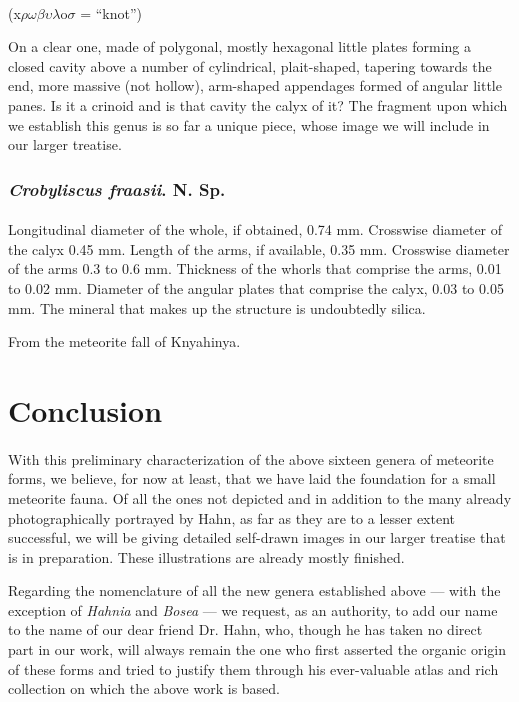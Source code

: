 \documentclass[a4paper, 12pt, oneside]{article}
\begin{document}
\paragraph{}
(x$\rho\omega\beta\upsilon\lambda$o$\sigma$ = ``knot'')%

On a clear one, made of polygonal, mostly hexagonal little plates forming a closed cavity above a number of cylindrical, plait-shaped, tapering towards the end, more massive (not hollow), arm-shaped appendages formed of angular little panes. Is it a crinoid and is that cavity the calyx of it? The fragment upon which we establish this genus is so far a unique piece, whose image we will include in our larger treatise.
\subsubsection{\emph{Crobyliscus fraasii}. N. Sp.}
\paragraph{}
Longitudinal diameter of the whole, if obtained, 0.74 mm. Crosswise diameter of the calyx 0.45 mm. Length of the arms, if available, 0.35 mm. Crosswise diameter of the arms 0.3 to 0.6 mm. Thickness of the whorls that comprise the arms, 0.01 to 0.02 mm. Diameter of the angular plates that comprise the calyx, 0.03 to 0.05 mm. The mineral that makes up the structure is undoubtedly silica.

From the meteorite fall of Knyahinya.
\clearpage
\section{Conclusion}
\paragraph{}
With this preliminary characterization of the above sixteen genera of meteorite forms, we believe, for now at least, that we have laid the foundation for a small meteorite fauna. Of all the ones not depicted and in addition to the many already photographically portrayed by Hahn, as far as they are to a lesser extent successful, we will be giving detailed self-drawn images in our larger treatise that is in preparation. These illustrations are already mostly finished.

Regarding the nomenclature of all the new genera established above --- with the exception of \emph{Hahnia} and \emph{Bosea} --- we request, as an authority, to add our name to the name of our dear friend Dr. Hahn, who, though he has taken no direct part in our work, will always remain the one who first asserted the organic origin of these forms and tried to justify them through his ever-valuable atlas and rich collection on which the above work is based.
\end{document}
